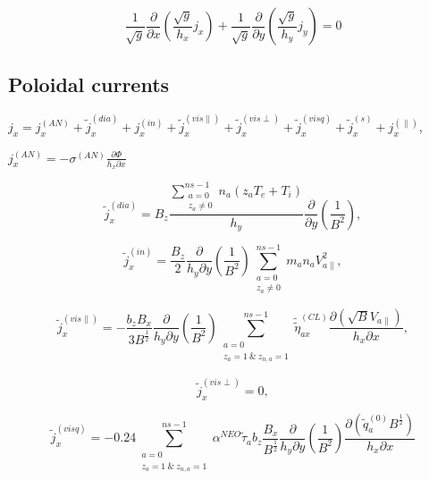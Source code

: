 \documentclass[a4paper,10pt]{report}
\begin{document}
\begin{equation}\label{eq:pot_eq}
\frac 1{\sqrt g} \frac{\partial}{\partial x} \left( \frac{\sqrt g}{h_x} j_x \right) +
\frac 1{\sqrt g} \frac{\partial}{\partial y} \left( \frac{\sqrt g}{h_y} j_y \right) = 0
\end{equation}

\subsection{Poloidal currents}

$j_x = j_x^{(AN)} + \widetilde j_x^{(dia)} + j_x^{(in)} + \widetilde j_x^{(vis \parallel)} + \widetilde j_x^{(vis \perp)}
+ \widetilde j_x^{(visq)} + \widetilde j_x^{(s)} + j^{(\parallel)}_x$,

$j_x^{(AN)} = - \sigma^{(AN)} \frac{\partial \Phi}{h_x \partial x}$

\begin{equation}
\widetilde j_x^{(dia)} = B_z \frac{
	\sum \limits^{ns-1}_{\substack{a = 0 \\ z_a \neq 0}} n_a \left(
		z_aT_e + T_i
	\right)
}{h_y}
\frac{\partial}{\partial y}
\left( \frac{1}{B^2} \right),
\end{equation}

\begin{equation}
\widetilde j_x^{(in)} = \frac{B_z}2 \frac{\partial}{h_y \partial y}
\left( \frac{1}{B^2} \right)
\sum \limits^{ns-1}_{\substack{a = 0 \\ z_a \neq 0}} m_a n_a V^2_{a \parallel},
\end{equation}


\begin{equation}
\widetilde j_x^{(vis \parallel)} =
- \frac{b_z B_x}{3 B^{\frac{1}{2}}}
\frac{\partial}{h_y \partial y}
\left( \frac{1}{B^2} \right)
\sum \limits^{ns-1}_{\substack{a = 0 \\ z_a = 1~\&~z_{n,a} = 1 }}
\widetilde{\widetilde{\eta}}^{(CL)}_{ax}
\frac{\partial \left( \sqrt{B} V_{a \parallel} \right)}{h_x \partial x},
\end{equation}

\begin{equation*}
\widetilde j_x^{(vis \perp)} = 0,
\end{equation*}

\begin{equation}
\widetilde j_x^{(visq)} =
- 0.24 \sum \limits^{ns-1}_{\substack{a = 0 \\ z_a = 1~\&~z_{n,a} = 1 }}
\alpha^{NEO} \widetilde{\tau}_a b_z
\frac{B_x}{B^{\frac{1}{2}}}
\frac{\partial}{h_y \partial y}
\left( \frac{1}{B^2} \right)
\frac{\partial \left( \widetilde{q}_a^{(0)} B^{\frac{1}{2}} \right)}{h_x \partial x}
\end{equation}
\end{document}
